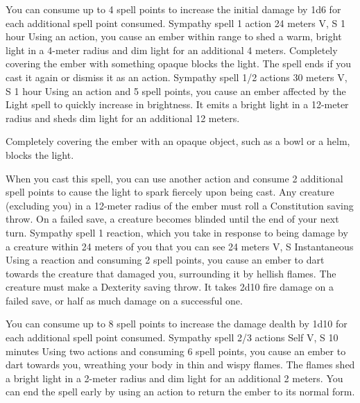         You can consume up to 4 spell points to increase the initial damage by 1d6 for each additional spell point consumed.
        {Sympathy spell}
        {1 action}
        {24 meters}
        {V, S}
        {1 hour}
        Using an action, you cause an ember within range to shed a warm, bright light in a 4-meter radius and dim light for an additional 4 meters.
        Completely covering the ember with something opaque blocks the light.
        The spell ends if you cast it again or dismiss it as an action.
        {Sympathy spell}
        {1/2 actions}
        {30 meters}
        {V, S}
        {1 hour}
        Using an action and 5 spell points, you cause an ember affected by the Light spell to quickly increase in brightness.
        It emits a bright light in a 12-meter radius and sheds dim light for an additional 12 meters.

        Completely covering the ember with an opaque object, such as a bowl or a helm, blocks the light.

        When you cast this spell, you can use another action and consume 2 additional spell points to cause the light to spark fiercely upon being cast.
        Any creature (excluding you) in a 12-meter radius of the ember must roll a Constitution saving throw.
        On a failed save, a creature becomes blinded until the end of your next turn.
        {Sympathy spell}
        {1 reaction, which you take in response to being damage by a creature within 24 meters of you that you can see}
        {24 meters}
        {V, S}
        {Instantaneous}
        Using a reaction and consuming 2 spell points, you cause an ember to dart towards the creature that damaged you, surrounding it by hellish flames.
        The creature must make a Dexterity saving throw.
        It takes 2d10 fire damage on a failed save, or half as much damage on a successful one.

        You can consume up to 8 spell points to increase the damage dealth by 1d10 for each additional spell point consumed.
        {Sympathy spell}
        {2/3 actions}
        {Self}
        {V, S}
        {10 minutes}
        Using two actions and consuming 6 spell points, you cause an ember to dart towards you, wreathing your body in thin and wispy flames.
        The flames shed a bright light in a 2-meter radius and dim light for an additional 2 meters.
        You can end the spell early by using an action to return the ember to its normal form.

